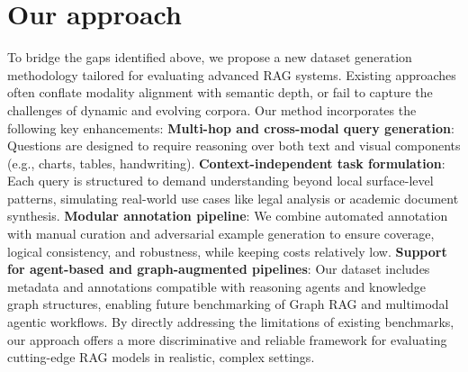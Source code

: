 \documentclass[12pt,twoside]{report}
\begin{document}
\section{Our approach}
To bridge the gaps identified above, we propose a new dataset generation methodology tailored for evaluating advanced RAG systems. Existing approaches often conflate modality alignment with semantic depth, or fail to capture the challenges of dynamic and evolving corpora. Our method incorporates the following key enhancements:
\textbf{Multi-hop and cross-modal query generation}: Questions are designed to require reasoning over both text and visual components (e.g., charts, tables, handwriting).
\textbf{Context-independent task formulation}: Each query is structured to demand understanding beyond local surface-level patterns, simulating real-world use cases like legal analysis or academic document synthesis.
\textbf{Modular annotation pipeline}: We combine automated annotation with manual curation and adversarial example generation to ensure coverage, logical consistency, and robustness, while keeping costs relatively low.
\textbf{Support for agent-based and graph-augmented pipelines}: Our dataset includes metadata and annotations compatible with reasoning agents and knowledge graph structures, enabling future benchmarking of Graph RAG and multimodal agentic workflows.
By directly addressing the limitations of existing benchmarks, our approach offers a more discriminative and reliable framework for evaluating cutting-edge RAG models in realistic, complex settings.
\end{document}

